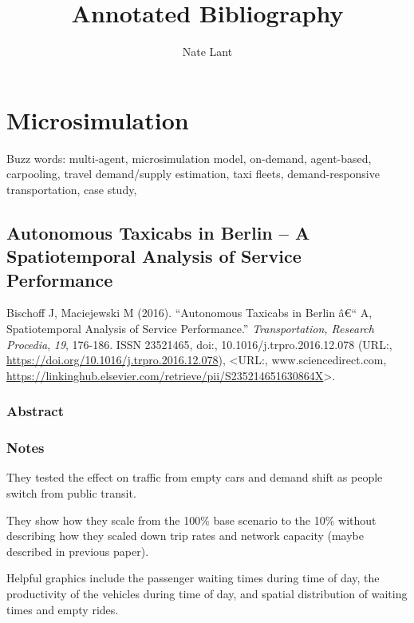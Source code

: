 \documentclass[
]{article}
\title{Annotated Bibliography}
\author{Nate Lant}
\date{}
\begin{document}
\maketitle

\hypertarget{microsimulation}{%
\section{Microsimulation}\label{microsimulation}}

Buzz words: multi-agent, microsimulation model, on-demand, agent-based,
carpooling, travel demand/supply estimation, taxi fleets,
demand-responsive transportation, case study,

\hypertarget{autonomous-taxicabs-in-berlin-a-spatiotemporal-analysis-of-service-performance}{%
\subsection{Autonomous Taxicabs in Berlin -- A Spatiotemporal Analysis
of Service
Performance}\label{autonomous-taxicabs-in-berlin-a-spatiotemporal-analysis-of-service-performance}}

Bischoff J, Maciejewski M (2016). ``Autonomous Taxicabs in Berlin â€``
A, Spatiotemporal Analysis of Service Performance.''
\emph{Transportation, Research Procedia}, \emph{19}, 176-186. ISSN
23521465, doi:, 10.1016/j.trpro.2016.12.078 (URL:,
\url{https://doi.org/10.1016/j.trpro.2016.12.078}), \textless URL:,
www.sciencedirect.com,
\url{https://linkinghub.elsevier.com/retrieve/pii/S235214651630864X}\textgreater.

\hypertarget{abstract}{%
\subsubsection{Abstract}\label{abstract}}

\hypertarget{notes}{%
\subsubsection{Notes}\label{notes}}

They tested the effect on traffic from empty cars and demand shift as
people switch from public transit.

They show how they scale from the 100\% base scenario to the 10\%
without describing how they scaled down trip rates and network capacity
(maybe described in previous paper).

Helpful graphics include the passenger waiting times during time of day,
the productivity of the vehicles during time of day, and spatial
distribution of waiting times and empty rides.
\end{document}
